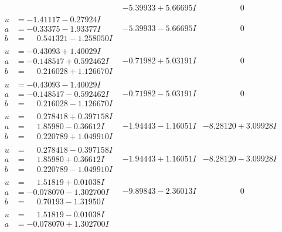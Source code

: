 \documentclass[1p]{elsarticle_modified}
\theoremstyle{definition}
\begin{document}
$$\begin{array}{c|c|c}
 & -5.39933 + 5.66695 I & \phantom{-0.000000 } 0 \\ \hline\begin{aligned}
u &= -1.41117 - 0.27924 I \\
a &= -0.33375 - 1.93377 I \\
b &= \phantom{-}0.541321 - 1.258050 I\end{aligned}
 & -5.39933 - 5.66695 I & \phantom{-0.000000 } 0 \\ \hline\begin{aligned}
u &= -0.43093 + 1.40029 I \\
a &= -0.148517 + 0.592462 I \\
b &= \phantom{-}0.216028 + 1.126670 I\end{aligned}
 & -0.71982 + 5.03191 I & \phantom{-0.000000 } 0 \\ \hline\begin{aligned}
u &= -0.43093 - 1.40029 I \\
a &= -0.148517 - 0.592462 I \\
b &= \phantom{-}0.216028 - 1.126670 I\end{aligned}
 & -0.71982 - 5.03191 I & \phantom{-0.000000 } 0 \\ \hline\begin{aligned}
u &= \phantom{-}0.278418 + 0.397158 I \\
a &= \phantom{-}1.85980 - 0.36612 I \\
b &= \phantom{-}0.220789 + 1.049910 I\end{aligned}
 & -1.94443 - 1.16051 I & -8.28120 + 3.09928 I \\ \hline\begin{aligned}
u &= \phantom{-}0.278418 - 0.397158 I \\
a &= \phantom{-}1.85980 + 0.36612 I \\
b &= \phantom{-}0.220789 - 1.049910 I\end{aligned}
 & -1.94443 + 1.16051 I & -8.28120 - 3.09928 I \\ \hline\begin{aligned}
u &= \phantom{-}1.51819 + 0.01038 I \\
a &= -0.078070 - 1.302700 I \\
b &= \phantom{-}0.70193 - 1.31950 I\end{aligned}
 & -9.89843 - 2.36013 I & \phantom{-0.000000 } 0 \\ \hline\begin{aligned}
u &= \phantom{-}1.51819 - 0.01038 I \\
a &= -0.078070 + 1.302700 I \\

\end{aligned}
\end{array}$$
\end{document}
